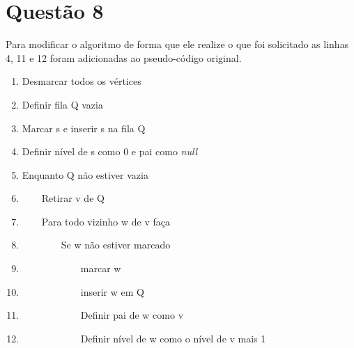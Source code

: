 \documentclass[a4paper,openright, 12pt]{article}
\begin{document}
\section*{Questão 8}
Para modificar o algoritmo de forma que ele realize o que foi solicitado as linhas 4, 11 e 12 foram adicionadas ao pseudo-código original.
\begin{enumerate}
    \item Desmarcar todos os vértices
    \item Definir fila Q vazia
    \item Marcar s e inserir s na fila Q
    \item Definir nível de s como 0 e pai como \textit{null} 
    \item Enquanto Q não estiver vazia \par
    \item \ \ \ \ Retirar v de Q 
    \item \ \ \ \ Para todo vizinho w de v faça
    \item \ \ \ \ \ \ \ \ Se w não estiver marcado
    \item \ \ \ \ \ \ \ \ \ \ \ \ marcar w
    \item \ \ \ \ \ \ \ \ \ \ \ \ inserir w em Q
    \item \ \ \ \ \ \ \ \ \ \ \ \ Definir pai de w como v
    \item \ \ \ \ \ \ \ \ \ \ \ \ Definir nível de w como o nível de v mais 1
    
\end{enumerate}
\end{document}

